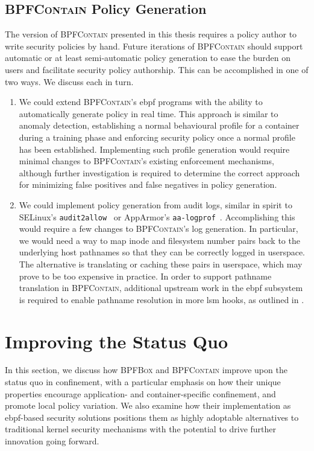 \documentclass[
  fontsize=12pt,
  titlepage=firstiscover,
  paper=letter,
oneside,
  cleardoublepage=plain,
  parskip=half-,
  DIV=10,
  parindent,
  appendixprefix,
  chapterprefix,
  listof=totoc,
]{scrbook}
\newcommand{\bpfbox}{\textsc{BPFBox}}
\newcommand{\bpfcontain}{\textsc{BPFContain}}
\begin{document}
\subsection{\bpfcontain{} Policy Generation}

The version of \bpfcontain{} presented in this thesis requires a policy author to write
security policies by hand. Future iterations of \bpfcontain{} should support automatic or
at least semi-automatic policy generation to ease the burden on users and facilitate
security policy authorship. This can be accomplished in one of two ways.  We discuss each
in turn.

\begin{enumerate}
  \item We could extend \bpfcontain{}'s \gls{ebpf} programs with the ability to
  automatically generate policy in real time. This approach is similar to
  anomaly detection, establishing a normal behavioural profile for
  a container during a training phase and enforcing security policy once a normal profile
  has been established. Implementing such profile generation would require minimal changes
  to \bpfcontain{}'s existing enforcement mechanisms, although further investigation is
  required to determine the correct approach for minimizing false positives and false
  negatives in policy generation.

  \item We could implement policy generation from audit logs, similar in spirit to
  SELinux's \texttt{audit2allow}~\cite{audit2allow} or AppArmor's
  \texttt{aa-logprof}~\cite{aa_logprof}. Accomplishing this would require a few changes to
  \bpfcontain{}'s log generation. In particular, we would need a way to map inode and
  filesystem number pairs back to the underlying host pathnames so that they can be
  correctly logged in userspace.  The alternative is translating or caching these pairs in
  userspace, which may prove to be too expensive in practice.  In order to support
  pathname translation in \bpfcontain{}, additional upstream work in the \gls{ebpf}
  subsystem is required to enable pathname resolution in more \gls{lsm} hooks, as outlined
  in .
\end{enumerate}


\section{Improving the Status Quo}\label{s:disc-improving}

In this section, we discuss how \bpfbox{} and \bpfcontain{} improve upon the status quo in
confinement, with a particular emphasis on how their unique properties encourage
application- and container-specific confinement, and promote local policy variation. We
also examine how their implementation as \gls{ebpf}-based security solutions positions
them as highly adoptable alternatives to traditional kernel security mechanisms with the
potential to drive further innovation going forward.
\end{document}
